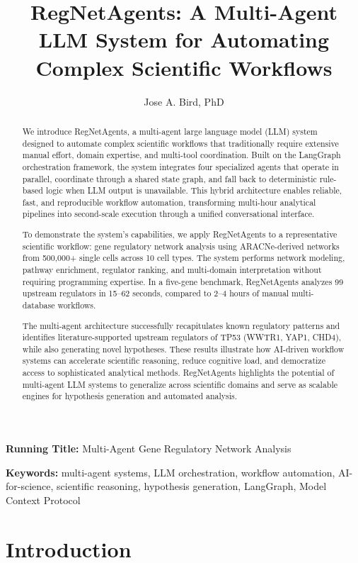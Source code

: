 \documentclass[11pt]{article}
\title{RegNetAgents: A Multi-Agent LLM System for Automating Complex Scientific Workflows}
\author[1]{Jose A. Bird, PhD}
\affil[1]{Bird AI Solutions\\
\texttt{jbird@birdaisolutions.com}}
\date{}
\begin{document}
\maketitle

\noindent\textbf{Running Title:} Multi-Agent Gene Regulatory Network Analysis

\begin{abstract}
We introduce RegNetAgents, a multi-agent large language model (LLM) system designed to automate complex scientific workflows that traditionally require extensive manual effort, domain expertise, and multi-tool coordination. Built on the LangGraph orchestration framework, the system integrates four specialized agents that operate in parallel, coordinate through a shared state graph, and fall back to deterministic rule-based logic when LLM output is unavailable. This hybrid architecture enables reliable, fast, and reproducible workflow automation, transforming multi-hour analytical pipelines into second-scale execution through a unified conversational interface.

To demonstrate the system's capabilities, we apply RegNetAgents to a representative scientific workflow: gene regulatory network analysis using ARACNe-derived networks from 500,000+ single cells across 10 cell types. The system performs network modeling, pathway enrichment, regulator ranking, and multi-domain interpretation without requiring programming expertise. In a five-gene benchmark, RegNetAgents analyzes 99 upstream regulators in 15--62 seconds, compared to 2--4 hours of manual multi-database workflows.

The multi-agent architecture successfully recapitulates known regulatory patterns and identifies literature-supported upstream regulators of TP53 (WWTR1, YAP1, CHD4), while also generating novel hypotheses. These results illustrate how AI-driven workflow systems can accelerate scientific reasoning, reduce cognitive load, and democratize access to sophisticated analytical methods. RegNetAgents highlights the potential of multi-agent LLM systems to generalize across scientific domains and serve as scalable engines for hypothesis generation and automated analysis.
\end{abstract}

\noindent\textbf{Keywords:} multi-agent systems, LLM orchestration, workflow automation, AI-for-science, scientific reasoning, hypothesis generation, LangGraph, Model Context Protocol

\section{Introduction}
\end{document}

